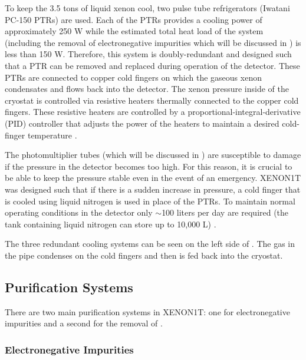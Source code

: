  To keep the 3.5 tons of liquid xenon cool, two pulse tube refrigerators (Iwatani PC-150 PTRs) are used.  Each of the PTRs provides a cooling power of approximately 250 W while the estimated total heat load of the system (including the removal of electronegative impurities which will be discussed in ) is less than 150 W.  Therefore, this system is doubly-redundant and designed such that a PTR can be removed and replaced during operation of the detector.  These PTRs are connected to copper cold fingers on which the gaseous xenon condensates and flows back into the detector.  The xenon pressure inside of the cryostat is controlled via resistive heaters thermally connected to the copper cold fingers.  These resistive heaters are  controlled by a proportional-integral-derivative (PID) controller that adjusts the power of the heaters to maintain a desired cold-finger temperature \cite{aprile2017xenon1t}.
 
 The photomultiplier tubes (which will be discussed in ) are susceptible to damage if the pressure in the detector becomes too high.  For this reason, it is crucial to be able to keep the pressure stable even in the event of an emergency.  XENON1T was designed such that if there is a sudden increase in pressure, a cold finger that is cooled using liquid nitrogen is used in place of the PTRs.  To maintain normal operating conditions in the detector only $\sim$100 liters per day are required (the tank containing liquid nitrogen can store up to 10,000 L) \cite{aprile2017xenon1t}.
 
 The three redundant cooling systems can be seen on the left side of .  The gas in the pipe condenses on the cold fingers and then is fed back into the cryostat.

 
 \subsection{Purification Systems}
 \label{sec:xe1t_pur}
 
 There are two main purification systems in XENON1T: one for electronegative impurities and a second for the removal of .  
 
 \subsubsection{Electronegative Impurities}
 \label{sec:xe1t_pur_electronegative}
 
